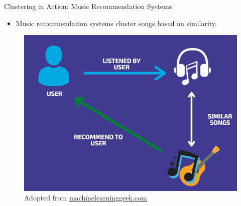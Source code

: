 \documentclass[serif, aspectratio=169]{beamer}
\begin{document}
\begin{frame}{Clustering in Action: Music Recommendation Systems }
\begin{itemize}
    \item Music recommendation systems cluster songs based on similarity.
\end{itemize}
  
    \begin{figure}
        \centering
        \includegraphics[scale=0.3]{pic/figs/image-4.png}
        {\scriptsize Adopted from \href{https://machinelearninggeek.com/spotify-song-recommender-system-in-python/}{machinelearninggeek.com}}
        
    \end{figure}
\end{frame}
\end{document}
